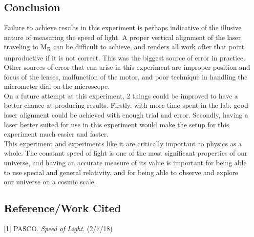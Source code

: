 \documentclass[12pt]{report}
\begin{document}
\subsection*{Conclusion}
Failure to achieve results in this experiment is perhaps indicative of the illusive nature of measuring the speed of light. A proper vertical alignment of the laser traveling to M\textsubscript{R} can be difficult to achieve, and renders all work after that point unproductive if it is not correct. This was the biggest source of error in practice. Other sources of error that can arise in this experiment are improper position and focus of the lenses, malfunction of the motor, and poor technique in handling the micrometer dial on the microscope.\\[10pt]
On a future attempt at this experiment, 2 things could be improved to have a better chance at producing results. Firstly, with more time spent in the lab, good laser alignment could be achieved with enough trial and error. Secondly, having a laser better suited for use in this experiment would make the setup for this experiment much easier and faster.\\[10pt]
This experiment and experiments like it are critically important to physics as a whole. The constant speed of light is one of the most significant properties of our universe, and having an accurate measure of its value is important for being able to use special and general relativity, and for being able to observe and explore our universe on a cosmic scale. 

\subsection*{Reference/Work Cited}
[1] PASCO. \textit{Speed of Light}. (2/7/18)
\end{document}
